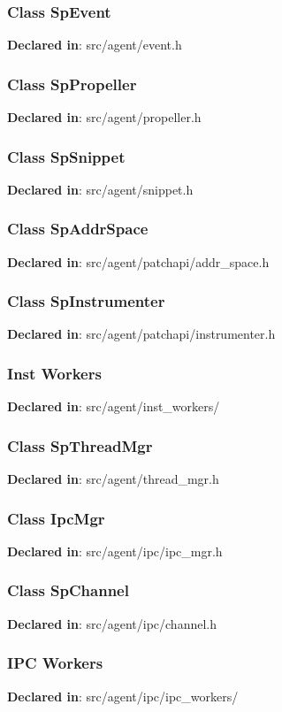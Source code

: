 \subsubsection{Class SpEvent}
\textbf{Declared in}: src/agent/event.h

\subsubsection{Class SpPropeller}
\textbf{Declared in}: src/agent/propeller.h

\subsubsection{Class SpSnippet}
\textbf{Declared in}: src/agent/snippet.h

\subsubsection{Class SpAddrSpace}
\textbf{Declared in}: src/agent/patchapi/addr\_space.h

\subsubsection{Class SpInstrumenter}
\textbf{Declared in}: src/agent/patchapi/instrumenter.h

\subsubsection{Inst Workers}
\textbf{Declared in}: src/agent/inst\_workers/

\subsubsection{Class SpThreadMgr}
\textbf{Declared in}: src/agent/thread\_mgr.h

\subsubsection{Class IpcMgr}
\textbf{Declared in}: src/agent/ipc/ipc\_mgr.h

\subsubsection{Class SpChannel}
\textbf{Declared in}: src/agent/ipc/channel.h

\subsubsection{IPC Workers}
\textbf{Declared in}: src/agent/ipc/ipc\_workers/


